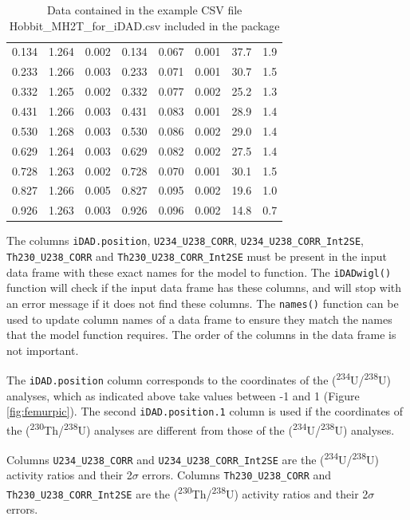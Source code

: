 \documentclass[]{elsarticle} %
\begin{document}
\begin{table}[ht]
\begin{tabular}{cccccccc}
  0.134 & 1.264 & 0.002 & 0.134 & 0.067 & 0.001 & 37.7 & 1.9 \\ 
  0.233 & 1.266 & 0.003 & 0.233 & 0.071 & 0.001 & 30.7 & 1.5 \\ 
  0.332 & 1.265 & 0.002 & 0.332 & 0.077 & 0.002 & 25.2 & 1.3 \\ 
  0.431 & 1.266 & 0.003 & 0.431 & 0.083 & 0.001 & 28.9 & 1.4 \\ 
  0.530 & 1.268 & 0.003 & 0.530 & 0.086 & 0.002 & 29.0 & 1.4 \\ 
  0.629 & 1.264 & 0.003 & 0.629 & 0.082 & 0.002 & 27.5 & 1.4 \\ 
  0.728 & 1.263 & 0.002 & 0.728 & 0.070 & 0.001 & 30.1 & 1.5 \\ 
  0.827 & 1.266 & 0.005 & 0.827 & 0.095 & 0.002 & 19.6 & 1.0 \\ 
  0.926 & 1.263 & 0.003 & 0.926 & 0.096 & 0.002 & 14.8 & 0.7 \\ 
   \hline
\end{tabular}
\caption{\label{tab:hobbitone}Data contained in the example CSV file Hobbit\_MH2T\_for\_iDAD.csv included in the package} 
\end{table}

The columns \texttt{iDAD.position}, \texttt{U234\_U238\_CORR}, \texttt{U234\_U238\_CORR\_Int2SE}, \texttt{Th230\_U238\_CORR} and \texttt{Th230\_U238\_CORR\_Int2SE} must be present in the input data frame with these exact names for the model to function. The \texttt{iDADwigl()} function will check if the input data frame has these columns, and will stop with an error message if it does not find these columns. The \texttt{names()} function can be used to update column names of a data frame to ensure they match the names that the model function requires. The order of the columns in the data frame is not important.

The \texttt{iDAD.position} column corresponds to the coordinates of the (\textsuperscript{234}U/\textsuperscript{238}U) analyses, which as indicated above take values between -1 and 1 (Figure \ref{fig:femurpic}). The second \texttt{iDAD.position.1} column is used if the coordinates of the (\textsuperscript{230}Th/\textsuperscript{238}U) analyses are different from those of the (\textsuperscript{234}U/\textsuperscript{238}U) analyses.

Columns \texttt{U234\_U238\_CORR} and \texttt{U234\_U238\_CORR\_Int2SE} are the (\textsuperscript{234}U/\textsuperscript{238}U) activity ratios and their 2\(\sigma\) errors. Columns \texttt{Th230\_U238\_CORR} and
\texttt{Th230\_U238\_CORR\_Int2SE} are the (\textsuperscript{230}Th/\textsuperscript{238}U) activity ratios and their 2\(\sigma\) errors.
\end{document}
